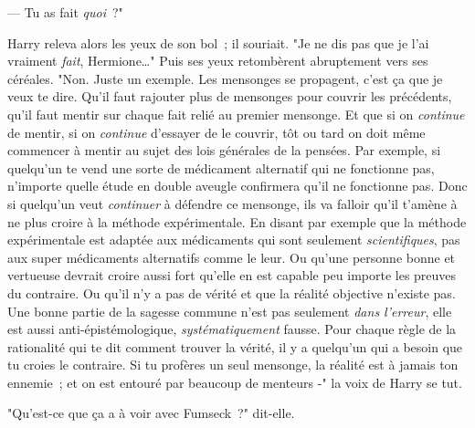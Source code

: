 --- Tu as fait \emph{quoi}~?"

Harry releva alors les yeux de son bol~; il souriait. "Je ne dis pas que je l'ai vraiment \emph{fait}, Hermione…" Puis ses yeux retombèrent abruptement vers ses céréales. "Non. Juste un exemple. Les mensonges se propagent, c'est ça que je veux te dire. Qu'il faut rajouter plus de mensonges pour couvrir les précédents, qu'il faut mentir sur chaque fait relié au premier mensonge. Et que si on \emph{continue} de mentir, si on \emph{continue} d'essayer de le couvrir, tôt ou tard on doit même commencer à mentir au sujet des lois générales de la pensées. Par exemple, si quelqu'un te vend une sorte de médicament alternatif qui ne fonctionne pas, n'importe quelle étude en double aveugle confirmera qu'il ne fonctionne pas. Donc si quelqu'un veut \emph{continuer} à défendre ce mensonge, ils va falloir qu'il t'amène à ne plus croire à la méthode expérimentale. En disant par exemple que la méthode expérimentale est adaptée aux médicaments qui sont seulement \emph{scientifiques}, pas aux super médicaments alternatifs comme le leur. Ou qu'une personne bonne et vertueuse devrait croire aussi fort qu'elle en est capable peu importe les preuves du contraire. Ou qu'il n'y a pas de vérité et que la réalité objective n'existe pas. Une bonne partie de la sagesse commune n'est pas seulement \emph{dans l'erreur}, elle est aussi anti-épistémologique, \emph{systématiquement} fausse. Pour chaque règle de la rationalité qui te dit comment trouver la vérité, il y a quelqu'un qui a besoin que tu croies le contraire. Si tu profères un seul mensonge, la réalité est à jamais ton ennemie~; et on est entouré par beaucoup de menteurs -" la voix de Harry se tut.

"Qu'est-ce que ça a à voir avec Fumseck~?" dit-elle.

